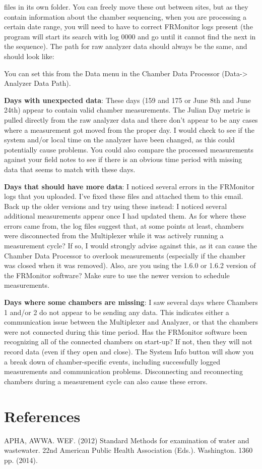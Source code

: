 \documentclass[12pt]{../SOP3}\usepackage[]{graphicx}\usepackage[]{color}
\begin{document}
files in its own folder. You can freely move these out between sites, but as they contain information about the chamber sequencing, when you are processing a certain date range, you will need to have to correct FRMonitor logs present (the program will start its search with log 0000 and go until it cannot find the next in the sequence). 
The path for raw analyzer data should always be the same, and should look like:  

You can set this from the Data menu in the Chamber Data Processor (Data-> Analyzer Data Path).

\NP \textbf{Days with unexpected data}:  
These days (159 and 175 or June 8th and June 24th) appear to contain valid chamber measurements. The Julian Day metric is pulled directly from the raw analyzer data and there don't appear to be any cases where a measurement got moved from the proper day. I would check to see if the system and/or local time on the analyzer have been changed, as this could potentially cause problems. You could also compare the processed measurements against your field notes to see if there is an obvious time period with missing data that seems to match with these days.

\NP \textbf{Days that should have more data}: 
I noticed several errors in the FRMonitor logs that you uploaded. I've fixed these files and attached them to this email. Back up the older versions and try using these instead: I noticed several additional measurements appear once I had updated them. As for where these errors came from, the log files suggest that, at some points at least, chambers were disconnected from the Multiplexer while it was actively running a measurement cycle? If so, I would strongly advise against this, as it can cause the Chamber Data Processor to overlook measurements (especially if the chamber was closed when it was removed). Also, are you using the 1.6.0 or 1.6.2 version of the FRMonitor software? Make sure to use the newer version to schedule measurements.


\NP \textbf{Days where some chambers are missing}: 
 I saw several days where Chambers 1 and/or 2 do not appear to be sending any data. This indicates either a communication issue between the Multiplexer and Analyzer, or that the chambers were not connected during this time period. Has the FRMonitor software been recognizing all of the connected chambers on start-up?  If not, then they will not record data (even if they open and close). The System Info button will show you a break down of chamber-specific events, including successfully logged measurements and communication problems. Disconnecting and reconnecting chambers during a measurement cycle can also cause these errors.




\section{References}

%

\NP APHA, AWWA. WEF. (2012) Standard Methods for examination of water and wastewater. 22nd American Public Health Association (Eds.). Washington. 1360 pp. (2014).
\end{document}
